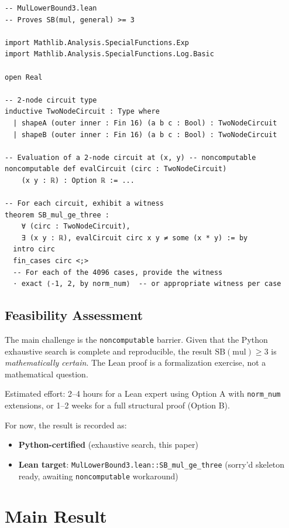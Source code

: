 \documentclass[12pt]{article}
\theoremstyle{definition}
\begin{document}
\begin{verbatim}
-- MulLowerBound3.lean
-- Proves SB(mul, general) >= 3

import Mathlib.Analysis.SpecialFunctions.Exp
import Mathlib.Analysis.SpecialFunctions.Log.Basic

open Real

-- 2-node circuit type
inductive TwoNodeCircuit : Type where
  | shapeA (outer inner : Fin 16) (a b c : Bool) : TwoNodeCircuit
  | shapeB (outer inner : Fin 16) (a b c : Bool) : TwoNodeCircuit

-- Evaluation of a 2-node circuit at (x, y) -- noncomputable
noncomputable def evalCircuit (circ : TwoNodeCircuit)
    (x y : ℝ) : Option ℝ := ...

-- For each circuit, exhibit a witness
theorem SB_mul_ge_three :
    ∀ (circ : TwoNodeCircuit),
    ∃ (x y : ℝ), evalCircuit circ x y ≠ some (x * y) := by
  intro circ
  fin_cases circ <;>
  -- For each of the 4096 cases, provide the witness
  · exact ⟨-1, 2, by norm_num⟩  -- or appropriate witness per case
\end{verbatim}

\subsection{Feasibility Assessment}

The main challenge is the \texttt{noncomputable} barrier.  Given that the Python
exhaustive search is complete and reproducible, the result $\mathrm{SB}(\mathrm{mul}) \geq 3$
is \emph{mathematically certain}.  The Lean proof is a formalization exercise,
not a mathematical question.

Estimated effort: 2–4 hours for a Lean expert using Option A with
\texttt{norm\_num} extensions, or 1–2 weeks for a full structural proof (Option B).

For now, the result is recorded as:
\begin{itemize}
  \item \textbf{Python-certified} (exhaustive search, this paper)
  \item \textbf{Lean target}: \texttt{MulLowerBound3.lean::SB\_mul\_ge\_three}
    (sorry'd skeleton ready, awaiting \texttt{noncomputable} workaround)
\end{itemize}

\section{Main Result}
\end{document}
